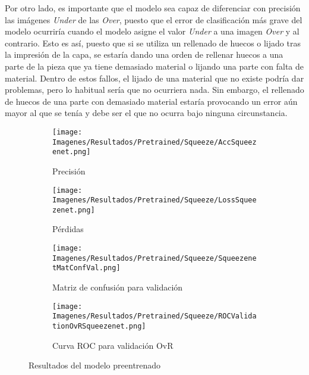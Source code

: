 \documentclass{report}
\begin{document}
Por otro lado, es importante que el modelo sea capaz de diferenciar con precisión las imágenes \textit{Under} de las \textit{Over}, puesto que el error de clasificación más grave del modelo ocurriría cuando el modelo asigne el valor \textit{Under} a una imagen \textit{Over} y al contrario. Esto es así, puesto que si se utiliza un rellenado de huecos o lijado tras la impresión de la capa, se estaría dando una orden de rellenar huecos a una parte de la pieza que ya tiene demasiado material o lijando una parte con falta de material. Dentro de estos fallos, el lijado de una material que no existe podría dar problemas, pero lo habitual sería que no ocurriera nada. Sin embargo, el rellenado de huecos de una parte con demasiado material estaría provocando un error aún mayor al que se tenía y debe ser el que no ocurra bajo ninguna circunstancia.

\vspace{0.4cm}
\begin{figure}[H]
	 	\centering
	 	\begin{subfigure}[b]{0.45\linewidth}
	 	\centering
	 		\texttt{[image: Imagenes/Resultados/Pretrained/Squeeze/AccSqueezenet.png]}
	 		\caption{ Precisión  }
                    \label{fig:Modelo11}
	 	\end{subfigure}
	 	\begin{subfigure}[b]{0.45\linewidth}
	 	\centering
	 		\texttt{[image: Imagenes/Resultados/Pretrained/Squeeze/LossSqueezenet.png]}
                    \caption{ Pérdidas }
                    \label{fig:Modelo12}
	 	\end{subfigure}
	 	\centering
	 	\begin{subfigure}[b]{0.45\linewidth}
	 	\centering
	 		\texttt{[image: Imagenes/Resultados/Pretrained/Squeeze/SqueezenetMatConfVal.png]}
	 		\caption{ Matriz de confusión para validación }
                    \label{fig:Modelo13}
	 	\end{subfigure}
	 	\centering
	 	\begin{subfigure}[b]{0.45\linewidth}
	 	\centering
	 		\texttt{[image: Imagenes/Resultados/Pretrained/Squeeze/ROCValidationOvRSqueezenet.png]}
	 		\caption{ Curva ROC para validación OvR }
                    \label{fig:Modelo14}
	 	\end{subfigure}
	 	\caption{ Resultados del modelo preentrenado}
	 	\label{fig:Modelo1}
\end{figure}
\vspace{4cm}
\end{document}
